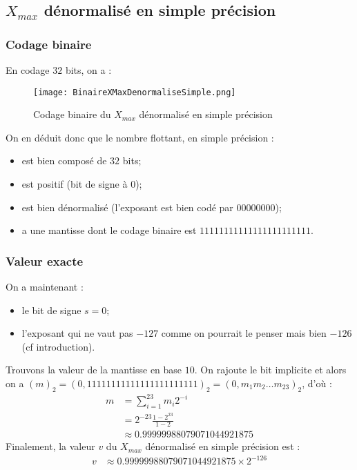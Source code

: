 \documentclass[a4paper, titlepage]{livret} %
\begin{document}
			\subsection{$X_{max}$ dénormalisé en simple précision}
				\subsubsection{Codage binaire}
					En codage $32$ bits, on a :
					\begin{figure}[!h]
						\centering
  							\texttt{[image: BinaireXMaxDenormaliseSimple.png]}
  							\caption{Codage binaire du $X_{max}$ dénormalisé en simple précision}
					\end{figure}

					On en déduit donc que le nombre flottant, en simple précision :
					\begin{itemize}
						\item est bien composé de $32$ bits;
						\item est positif (bit de signe à 0);
						\item est bien dénormalisé (l'exposant est bien codé par $00000000$);
						\item a une mantisse dont le codage binaire est $11111111 11111111 1111111$.
					\end{itemize}

				\subsubsection{Valeur exacte}
					On a maintenant : 
					\begin{itemize}
						\item le bit de signe $s = 0$;
						\item l'exposant qui ne vaut pas $-127$ comme on pourrait le penser mais bien $-126$ (cf introduction).
					\end{itemize}
					Trouvons la valeur de la mantisse en base $10$.
					On rajoute le bit implicite et alors on a $(m)_{2} = (0,11111111 11111111 1111111)_{2} = (0,m_{1}m_{2}…m_{23})_{2}$, d'où :
					\[\begin{aligned}
						m & = \sum_{i=1}^{23} m_{i}2^{-i}\\
						  & = 2^{-23}\frac{1 - 2^{23}}{1 - 2}\\
						  & \approx 0.99999988079071044921875
					\end{aligned}\]
					Finalement, la valeur $v$ du $X_{max}$ dénormalisé en simple précision est :
					\[\begin{aligned}
						v & \approx 0.99999988079071044921875 \times 2^{-126}
					\end{aligned}\]
\end{document}

